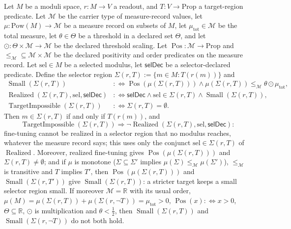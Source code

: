 \begin{theorem}\label{thm:F47}
Let \(M\) be a moduli space, \(r:M\to V\) a readout, and
\(T:V\to\mathrm{Prop}\) a target-region predicate.  Let
\(\mathcal M\) be the carrier type of measure-record values, let
\(\mu:\mathrm{Pow}(M)\to\mathcal M\) be a measure record on subsets
of \(M\), let \(\mu_{\mathrm{tot}}\in\mathcal M\) be the total
measure, let \(\theta\in\Theta\) be a threshold in a declared set \(\Theta\), and let
\(\odot:\Theta\times\mathcal M\to\mathcal M\) be the declared
threshold scaling.  Let \(\operatorname{Pos}:\mathcal M\to
\mathrm{Prop}\) and \({\le_{\mathcal M}}\subseteq
\mathcal M\times\mathcal M\) be the declared positivity and order
predicates on the measure record.  Let \(\mathrm{sel}\in M\) be a
selected modulus, let \(\mathsf{selDec}\) be a selector-declared
predicate.  Define the selector region
\(\Sigma(r,T):=\{m\in M:T(r(m))\}\) and
\begin{align*}
  \operatorname{Small}(\Sigma(r,T))
  &:\Longleftrightarrow
  \operatorname{Pos}(\mu(\Sigma(r,T)))
  \wedge
  \mu(\Sigma(r,T))\le_{\mathcal M}\theta\odot\mu_{\mathrm{tot}},\\
  \operatorname{Realized}(\Sigma(r,T),\mathrm{sel},\mathsf{selDec})
  &:\Longleftrightarrow
  \mathsf{selDec}
  \wedge
  \mathrm{sel}\in\Sigma(r,T)
  \wedge
  \operatorname{Small}(\Sigma(r,T)),\\
  \operatorname{TargetImpossible}(\Sigma(r,T))
  &:\Longleftrightarrow
  \Sigma(r,T)=\emptyset.
\end{align*}
Then \(m\in\Sigma(r,T)\) if and only if \(T(r(m))\), and
\[
  \operatorname{TargetImpossible}(\Sigma(r,T))
  \Longrightarrow
  \neg\operatorname{Realized}(\Sigma(r,T),\mathrm{sel},\mathsf{selDec}):
\]
fine-tuning cannot be realized in a selector region that no modulus
reaches, whatever the measure record says; this uses only the conjunct
\(\mathrm{sel}\in\Sigma(r,T)\) of \(\operatorname{Realized}\). Moreover, realized fine-tuning
gives \(\operatorname{Pos}(\mu(\Sigma(r,T)))\) and \(\Sigma(r,T)\ne\emptyset\);
and if \(\mu\) is monotone (\(\Sigma\subseteq\Sigma'\) implies
\(\mu(\Sigma)\le_{\mathcal M}\mu(\Sigma')\)), \(\le_{\mathcal M}\) is transitive
and \(T\) implies \(T'\), then
\(\operatorname{Pos}(\mu(\Sigma(r,T)))\) and \(\operatorname{Small}(\Sigma(r,T'))\)
give \(\operatorname{Small}(\Sigma(r,T))\): a stricter target keeps a small
selector region small. If moreover \(\mathcal M=\mathbb R\) with its usual order,
\(\mu(M)=\mu(\Sigma(r,T))+\mu(\Sigma(r,\neg T))=\mu_{\mathrm{tot}}>0\),
\(\operatorname{Pos}(x):\Leftrightarrow x>0\), \(\Theta\subseteq\mathbb R\), \(\odot\) is multiplication and
\(\theta<\tfrac12\), then \(\operatorname{Small}(\Sigma(r,T))\) and
\(\operatorname{Small}(\Sigma(r,\neg T))\) do not both hold.
\end{theorem}
